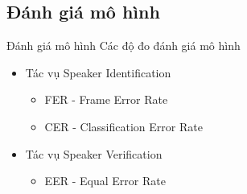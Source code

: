 \documentclass[notheorems, aspectratio=54]{beamer}
\begin{document}
\subsection{Đánh giá mô hình}
\begin{frame}{Đánh giá mô hình}
	Các độ đo đánh giá mô hình
	\begin{itemize}
		\item Tác vụ Speaker Identification
		\begin{itemize}
			\item FER - Frame Error Rate
			\item CER - Classification Error Rate
		\end{itemize}
		\item Tác vụ Speaker Verification
		\begin{itemize}
			\item EER - Equal Error Rate
		\end{itemize}
	\end{itemize}
\end{frame}
\end{document}
